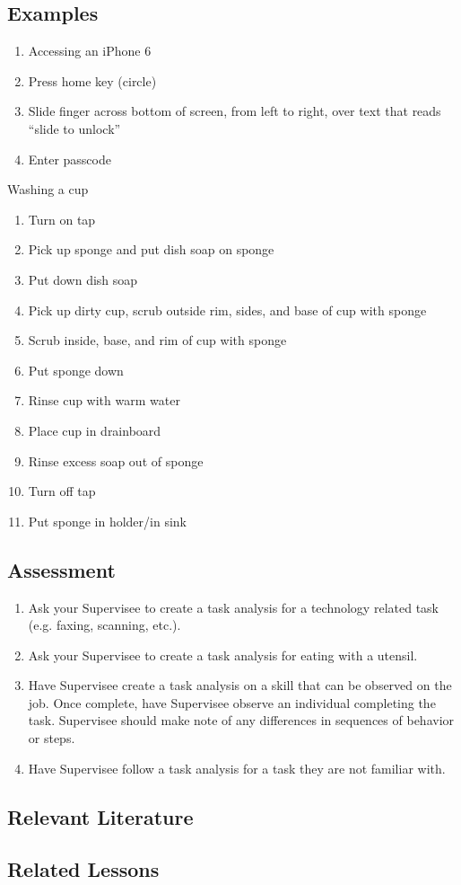 \subsection{Examples}
\begin{enumerate}
\item Accessing an iPhone 6
\item Press home key (circle) 
\item Slide finger across bottom of screen, from left to right, over text that reads ``slide to unlock''
\item Enter passcode
\end{enumerate}
%
Washing a cup
\begin{enumerate}
\item Turn on tap
\item Pick up sponge and put dish soap on sponge
\item Put down dish soap
\item Pick up dirty cup, scrub outside rim, sides, and base of cup with sponge
\item Scrub inside, base, and rim of cup with sponge
\item Put sponge down
\item Rinse cup with warm water
\item Place cup in drainboard 
\item Rinse excess soap out of sponge
\item Turn off tap
\item Put sponge in holder/in sink
\end{enumerate}
%
\subsection{Assessment}
\begin{enumerate}
\item Ask your Supervisee to create a task analysis for a technology related task (e.g. faxing, scanning, etc.).
\item Ask your Supervisee to create a task analysis for eating with a utensil. 
\item Have Supervisee create a task analysis on a skill that can be observed on the job. Once complete, have Supervisee observe an individual completing the task. Supervisee should make note of any differences in sequences of behavior or steps.
\item Have Supervisee follow a task analysis for a task they are not familiar with.
\end{enumerate}
%
\subsection{Relevant Literature}
\begin{refsection}
\nocite{cooper2007applied,
    resnick1973task,
    bancroft2011comparison,
    jerome2007effects,
    slocum2011assessment}
\printbibliography[heading=none]
\end{refsection}
%
\subsection{Related Lessons}
\fourdThree{}\\
\fourdFive{}\\
\fourdSix{}\\
